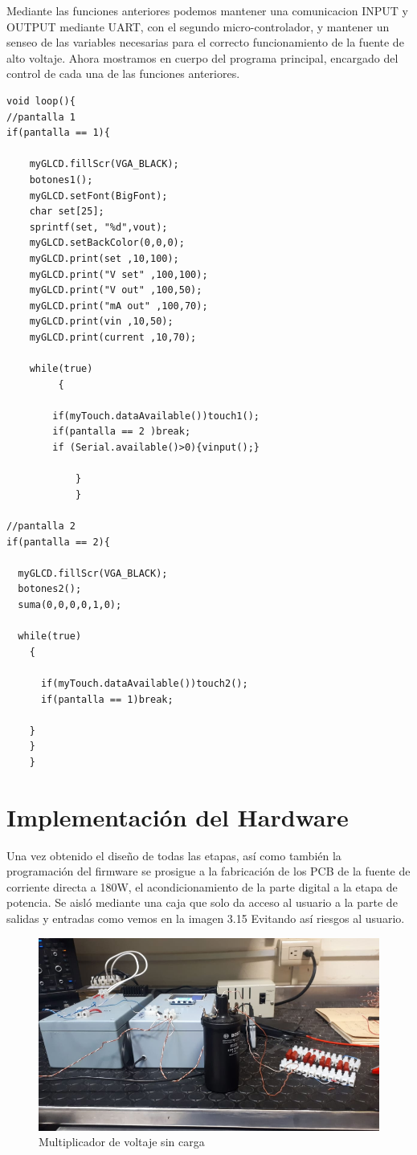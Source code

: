 Mediante las funciones anteriores podemos mantener una comunicacion INPUT y OUTPUT mediante UART, con el segundo micro-controlador, y mantener un senseo de las variables necesarias para el correcto funcionamiento de la fuente de alto voltaje. Ahora mostramos en cuerpo del programa principal, encargado del control de cada una de las funciones anteriores.

\begin{verbatim}
void loop(){
//pantalla 1
if(pantalla == 1){

    myGLCD.fillScr(VGA_BLACK);
    botones1();
    myGLCD.setFont(BigFont); 
    char set[25];
    sprintf(set, "%d",vout);
    myGLCD.setBackColor(0,0,0);
    myGLCD.print(set ,10,100);
    myGLCD.print("V set" ,100,100);
    myGLCD.print("V out" ,100,50);
    myGLCD.print("mA out" ,100,70);
    myGLCD.print(vin ,10,50);
    myGLCD.print(current ,10,70);
    
    while(true)
         {
         
        if(myTouch.dataAvailable())touch1();
        if(pantalla == 2 )break;
      	if (Serial.available()>0){vinput();}
      
            }
            }
        
//pantalla 2
if(pantalla == 2){

  myGLCD.fillScr(VGA_BLACK);
  botones2();
  suma(0,0,0,0,1,0);
  
  while(true)
    {
    
      if(myTouch.dataAvailable())touch2();
      if(pantalla == 1)break;
      
    }
    }
    }
\end{verbatim}
\newpage
\section{Implementación del Hardware}

Una vez obtenido el diseño de todas las etapas, así como también la programación del firmware se prosigue a la fabricación de los PCB de la fuente de corriente directa a 180W, el acondicionamiento de la parte digital a la etapa de potencia. Se aisló mediante una caja que solo da acceso al usuario a la parte de salidas y entradas como vemos en la imagen 3.15 Evitando así riesgos al usuario. \\


\begin{figure}[H]
\centering
\includegraphics[width=12cm]{Capitulo3/figs/noimagen.png}
\caption{Multiplicador de voltaje sin carga}
\end{figure}

